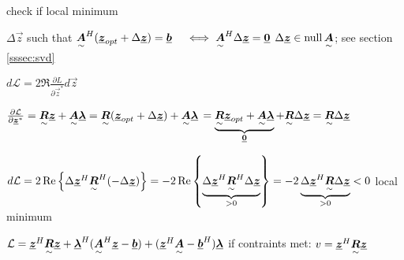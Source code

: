 check if local minimum

$\Delta\vec{z}$ such that $\ma{A}^H(\vec{z}_{opt}+\Delta\vec{z})=\vec{b}   
\quad \iff \ma{A}^H\Delta\vec{z} =\vec{0}$ \qquad $\Delta \vec{z}\in \operatorname{null} \ma{A}$; see section \ref{sssec:svd}

$d\mathcal{L}=2\Re{\frac{\partial L}{\partial \vec{z}^*}d\vec{z}}$

$\frac{\partial \mathcal{L}}{\partial \vec{z}^*}=\ma{R}\vec{z}+\ma{A}\vec{\lambda}
=\ma{R}(\vec{z}_{opt}+\Delta \vec{z})+\ma{A}\vec{\lambda}$
$=\underbrace{\ma{R}\vec{z}_{opt}+\ma{A}\vec{\lambda}}_{\vec{0}}+\ma{R}\Delta\vec{z}
=\ma{R}\Delta\vec{z}$

$d\mathcal{L}=2\Re{\Delta \vec{z}^H\ma{R}^H(-\Delta \vec{z})}
=-2\Re{\underbrace{\Delta \vec{z}^H\ma{R}^H\Delta\vec{z}}_{>0}}=-2\underbrace{\Delta\vec{z}^H\ma{R}\Delta\vec{z}}_{>0}<0$ \quad local minimum

$\mathcal{L}=\vec{z}^H\ma{R}\vec{z}+\vec{\lambda}^H(\ma{A}^H\vec{z}-\vec{b})+(\vec{z}^H\ma{A}-\vec{b}^H)\vec{\lambda}$ \quad if contraints met: $v=\vec{z}^H\ma{R}\vec{z}$